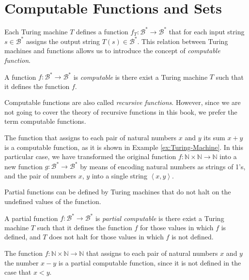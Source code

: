 %
%

\section{Computable Functions and Sets}
\label{sec:computable_functions}

Each Turing machine $T$ defines a function $f_T:\mathcal{B}^{\ast}\rightarrow\mathcal{B}^{\ast}$ that for each input string $s\in\mathcal{B}^{\ast}$ assigns the output string $T(s)\in\mathcal{B}^{\ast}$. This relation between Turing machines and functions allows us to introduce the concept of \emph{computable function}. 

\begin{definition}
\label{def:computable-function}
A function $f:\mathcal{B}^{\ast}\rightarrow\mathcal{B}^{\ast}$ is \emph{computable} is there exist a Turing machine $T$ such that it defines the function $f$.
\end{definition}

Computable functions are also called \emph{recursive functions}. However, since we are not going to cover the theory of recursive functions in this book, we prefer the term computable functions.

\begin{example}
The function that assigns to each pair of natural numbers $x$ and $y$ its sum $x + y$ is a computable function, as it is shown in Example \ref{ex:Turing-Machine}. In this particular case, we have transformed the original function $f: \mathbb{N} \times \mathbb{N} \rightarrow \mathbb{N}$ into a new function $g:\mathcal{B}^{\ast}\rightarrow\mathcal{B}^{\ast}$ by means of encoding natural numbers as strings of 1's, and the pair of numbers $x$, $y$ into a single string $\left\langle x, y \right\rangle$.
\end{example}

Partial functions can be defined by Turing machines that do not halt on the undefined values of the function.

\begin{definition}
A partial function $f:\mathcal{B}^{\ast}\rightarrow\mathcal{B}^{\ast}$ is \emph{partial computable} is there exist a Turing machine $T$ such that it defines the function $f$ for those values in which $f$ is defined, and $T$ does not halt for those values in which $f$ is not defined.
\end{definition}

\begin{example}
The function $f: \mathbb{N} \times \mathbb{N} \rightarrow \mathbb{N}$ that assigns to each pair of natural numbers $x$ and $y$ the number $x - y$ is a partial computable function, since it is not defined in the case that $x < y$.
\end{example}

